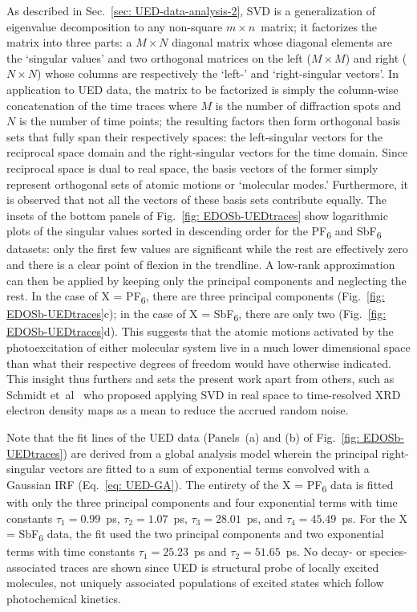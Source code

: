 As described in Sec.~\ref{sec: UED-data-analysis-2},
SVD is a generalization of eigenvalue decomposition to any non-square $m \times n$~matrix;
it factorizes the matrix into three parts:
a $M \times N$ diagonal matrix whose diagonal elements are the `singular values' and
two orthogonal matrices on the left ($M \times M$) and right ($N \times N$)
whose columns are respectively the `left-' and `right-singular vectors'.
%
In application to UED data, the matrix to be factorized is simply the column-wise concatenation
of the time traces where $M$ is the number of diffraction spots and $N$ is the number of time points;
the resulting factors then form orthogonal basis sets that fully span their respectively spaces:
the left-singular vectors for the reciprocal space domain and the right-singular vectors for the time domain.
Since reciprocal space is dual to real space, the basis vectors of the former simply represent
orthogonal sets of atomic motions or `molecular modes.'
%
Furthermore, it is observed that not all the vectors of these basis sets contribute equally.
The insets of the bottom panels of Fig.~\ref{fig: EDOSb-UEDtraces} show logarithmic plots
of the singular values sorted in descending order for the PF\textsubscript{6} and SbF\textsubscript{6} datasets:
only the first few values are significant while the rest are effectively zero
and there is a clear point of flexion in the trendline.
%
A low-rank approximation can then be applied by keeping only the principal components
and neglecting the rest.
%
In the case of X = PF\textsubscript{6}, there are three principal components (Fig.~\ref{fig: EDOSb-UEDtraces}c);
in the case of X = SbF\textsubscript{6}, there are only two (Fig.~\ref{fig: EDOSb-UEDtraces}d).
%
This suggests that the atomic motions activated by the photoexcitation of either molecular system
live in a much lower dimensional space than what their respective degrees of freedom
would have otherwise indicated.
%
This insight thus furthers and sets the present work apart from others,
such as Schmidt et~al~\cite{Schmidt2003} who proposed applying SVD in real space
to time-resolved XRD electron density maps as a mean to reduce the accrued random noise.

Note that the fit lines of the UED data (Panels~(a) and (b) of Fig.~\ref{fig: EDOSb-UEDtraces})
are derived from a global analysis model wherein the principal right-singular vectors are fitted
to a sum of exponential terms convolved with a Gaussian IRF (Eq.~\eqref{eq: UED-GA}).
%
The entirety of the X = PF\textsubscript{6} data is fitted with only the three principal components
and four exponential terms with time constants $\tau_1 = 0.99$~ps, $\tau_2 = 1.07$~ps, $\tau_3 = 28.01$~ps, and
$\tau_4 = 45.49$~ps.
For the X = SbF\textsubscript{6} data, the fit used the two principal components and
two exponential terms with time constants $\tau_1 = 25.23$~ps and $\tau_2 = 51.65$~ps.
%
No decay- or species-associated traces are shown since UED is structural probe of
locally excited molecules, not uniquely associated populations of excited states which follow
photochemical kinetics.


